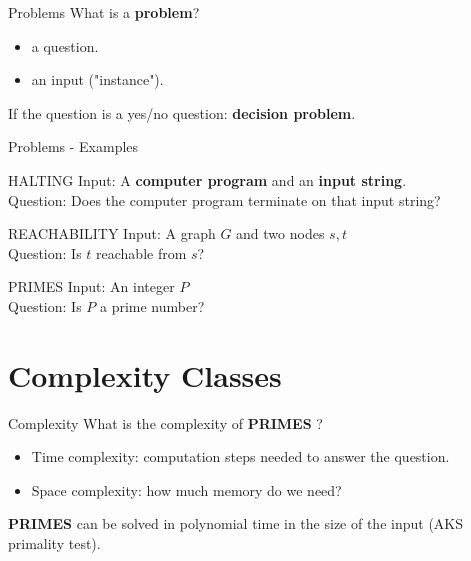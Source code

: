 \documentclass[c]{beamer}
\begin{document}
\begin{frame}{Problems}
        What is a \textbf{problem}?
         \begin{itemize}
			\item a question.
			\item an input ("instance").
		\end{itemize}	 
		
		If the question is a yes/no question: \textbf{decision problem}. 		
	
\end{frame}

\begin{frame}{Problems - Examples}
    \begin{block}{ HALTING }
		Input: A \textbf{computer program} and an \textbf{input string}.\\
		Question: Does the computer program terminate on that input string?
    \end{block}	
	
	\begin{block}{ REACHABILITY }
		Input: A graph $G$ and two nodes $s,t$\\
		Question: Is $t$ reachable from $s$?
    \end{block}	
    
    \begin{block}{ PRIMES }
		Input: An integer $P$\\
		Question: Is $P$ a prime number?
    \end{block}	
    
\end{frame}

\section{Complexity Classes}
\begin{frame}{Complexity}
      What is the complexity of \textbf{PRIMES} ?
	 \begin{itemize}
			\item Time complexity: computation steps needed to answer the question.
			\item Space complexity: how much memory do we need?
	 \end{itemize}
	 
	 \textbf{PRIMES} can be solved in polynomial time in the size of the input (AKS primality test).
	 
\end{frame}
\end{document}
